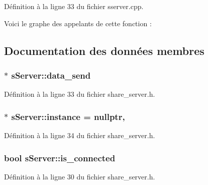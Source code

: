 Définition à la ligne 33 du fichier sserver.\-cpp.



Voici le graphe des appelants de cette fonction \-:




\subsection{Documentation des données membres}
\hypertarget{classs_server_ad24c799f06a327db74a17fd30c78eff5}{
\subsubsection[{data\-\_\-send}]{$\ast$ s\-Server\-::data\-\_\-send\hspace{0.3cm}{\ttfamily [private]}}}\label{classs_server_ad24c799f06a327db74a17fd30c78eff5}


Définition à la ligne 33 du fichier share\-\_\-server.\-h.

\hypertarget{classs_server_a5567b4d6b98047dbc17c7c4072a71a62}{
\subsubsection[{instance}]{ $\ast$ s\-Server\-::instance = nullptr\hspace{0.3cm}{\ttfamily [static]}, {\ttfamily [private]}}}\label{classs_server_a5567b4d6b98047dbc17c7c4072a71a62}


Définition à la ligne 34 du fichier share\-\_\-server.\-h.

\hypertarget{classs_server_adeee5a2ac165a0d9df35757d2ddfc70d}{
\subsubsection[{is\-\_\-connected}]{\setlength{\rightskip}{0pt plus 5cm}bool s\-Server\-::is\-\_\-connected\hspace{0.3cm}{\ttfamily [private]}}}\label{classs_server_adeee5a2ac165a0d9df35757d2ddfc70d}


Définition à la ligne 30 du fichier share\-\_\-server.\-h.

